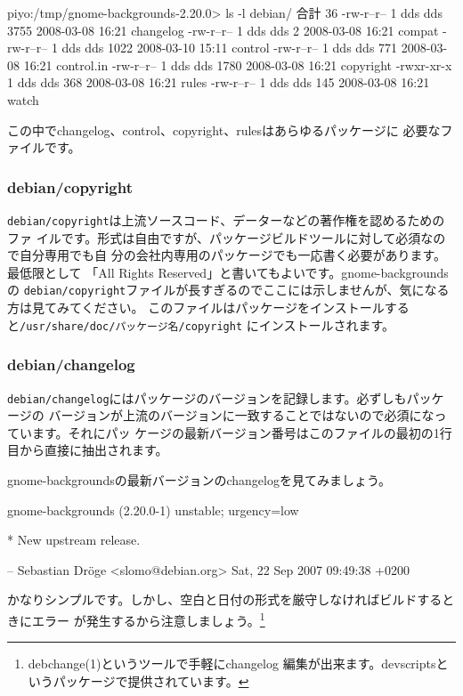 \documentclass[mingoth,a4paper]{jsarticle}
\begin{document}
\begin{commandline}
piyo:/tmp/gnome-backgrounds-2.20.0> ls -l debian/
合計 36
-rw-r--r-- 1 dds dds 3755 2008-03-08 16:21 changelog
-rw-r--r-- 1 dds dds    2 2008-03-08 16:21 compat
-rw-r--r-- 1 dds dds 1022 2008-03-10 15:11 control
-rw-r--r-- 1 dds dds  771 2008-03-08 16:21 control.in
-rw-r--r-- 1 dds dds 1780 2008-03-08 16:21 copyright
-rwxr-xr-x 1 dds dds  368 2008-03-08 16:21 rules
-rw-r--r-- 1 dds dds  145 2008-03-08 16:21 watch
\end{commandline}

この中でchangelog、control、copyright、rulesはあらゆるパッケージに
必要なファイルです。

\subsubsection{debian/copyright}

\texttt{debian/copyright}は上流ソースコード、データーなどの著作権を認めるためのファ
イルです。形式は自由ですが、パッケージビルドツールに対して必須なので自分専用でも自
分の会社内専用のパッケージでも一応書く必要があります。最低限として
「All Rights Reserved」と書いてもよいです。gnome-backgroundsの
\texttt{debian/copyright}ファイルが長すぎるのでここには示しませんが、気になる
方は見てみてください。
このファイルはパッケージをインストールすると\texttt{/usr/share/doc/パッケージ名/copyright}
にインストールされます。

\subsubsection{debian/changelog}

\texttt{debian/changelog}にはパッケージのバージョンを記録します。必ずしもパッケージの
バージョンが上流のバージョンに一致することではないので必須になっています。それにパッ
ケージの最新バージョン番号はこのファイルの最初の1行目から直接に抽出されます。

gnome-backgroundsの最新バージョンのchangelogを見てみましょう。
\begin{commandline}
gnome-backgrounds (2.20.0-1) unstable; urgency=low

  * New upstream release.

 -- Sebastian Dr\"oge <slomo@debian.org>  Sat, 22 Sep 2007 09:49:38 +0200
\end{commandline}

かなりシンプルです。しかし、空白と日付の形式を厳守しなければビルドするときにエラー
が発生するから注意しましょう。\footnote{debchange(1)というツールで手軽にchangelog
編集が出来ます。devscriptsというパッケージで提供されています。}
\end{document}
